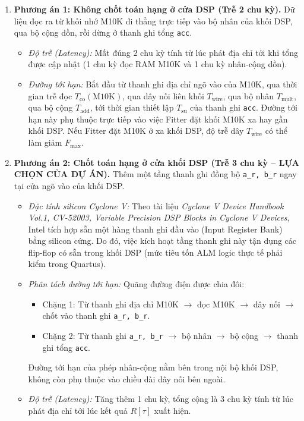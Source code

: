 \begin{enumerate}[leftmargin=1.5em, itemsep=3pt]
    \item \textbf{Phương án 1: Không chốt toán hạng ở cửa DSP (Trễ 2 chu kỳ).}
    Dữ liệu đọc ra từ khối nhớ M10K đi thẳng trực tiếp vào bộ nhân của khối DSP, qua bộ cộng dồn, rồi dừng ở thanh ghi tổng \texttt{acc}.
    \begin{itemize}[leftmargin=1.2em, itemsep=2pt]
        \item \emph{Độ trễ (Latency):} Mất đúng $2\text{ chu kỳ}$ tính từ lúc phát địa chỉ tới khi tổng được cập nhật (1 chu kỳ đọc RAM M10K và 1 chu kỳ nhân-cộng dồn).
        \item \emph{Đường tới hạn:} Bắt đầu từ thanh ghi địa chỉ ngõ vào của M10K, qua thời gian trễ đọc $T_{\text{co}}(\text{M10K})$, qua dây nối liên khối $T_{\text{wire}}$, qua bộ nhân $T_{\text{mult}}$, qua bộ cộng $T_{\text{add}}$, tới thời gian thiết lập $T_{\text{su}}$ của thanh ghi \texttt{acc}. Đường tới hạn này phụ thuộc trực tiếp vào việc Fitter đặt khối M10K xa hay gần khối DSP. Nếu Fitter đặt M10K ở xa khối DSP, độ trễ dây $T_{\text{wire}}$ có thể làm giảm $F_{\max}$.
    \end{itemize}

    \item \textbf{Phương án 2: Chốt toán hạng ở cửa khối DSP (Trễ 3 chu kỳ -- LỰA CHỌN CỦA DỰ ÁN).}
    Thêm một tầng thanh ghi đồng bộ \texttt{a\_r, b\_r} ngay tại cửa ngõ vào của khối DSP.
    \begin{itemize}[leftmargin=1.2em, itemsep=2pt]
        \item \emph{Đặc tính silicon Cyclone V:} Theo tài liệu \emph{Cyclone V Device Handbook Vol.1, CV-52003, Variable Precision DSP Blocks in Cyclone V Devices}, Intel tích hợp sẵn một hàng thanh ghi đầu vào (Input Register Bank) bằng silicon cứng. Do đó, việc kích hoạt tầng thanh ghi này tận dụng các flip-flop có sẵn trong khối DSP (mức tiêu tốn ALM logic thực tế phải kiểm trong Quartus).
        \item \emph{Phân tách đường tới hạn:} Quãng đường điện được chia đôi:
        \begin{itemize}[leftmargin=1.2em, itemsep=1pt]
            \item Chặng 1: Từ thanh ghi địa chỉ M10K $\to$ đọc M10K $\to$ dây nối $\to$ chốt vào thanh ghi \texttt{a\_r, b\_r}.
            \item Chặng 2: Từ thanh ghi \texttt{a\_r, b\_r} $\to$ bộ nhân $\to$ bộ cộng $\to$ thanh ghi tổng \texttt{acc}.
        \end{itemize}
        Đường tới hạn của phép nhân-cộng nằm bên trong nội bộ khối DSP, không còn phụ thuộc vào chiều dài dây nối bên ngoài.
        \item \emph{Độ trễ (Latency):} Tăng thêm 1 chu kỳ, tổng cộng là $3\text{ chu kỳ}$ tính từ lúc phát địa chỉ tới lúc kết quả $R[\tau]$ xuất hiện.
    \end{itemize}


\end{enumerate}
